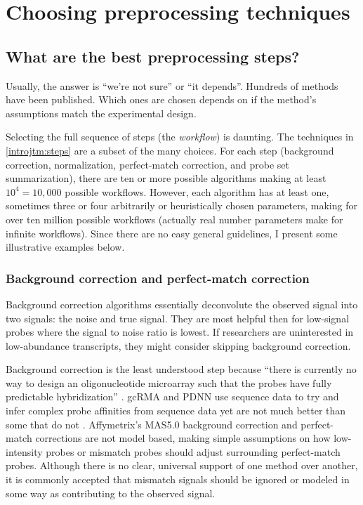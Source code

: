 \section{Choosing preprocessing techniques}

\subsection{What are the best preprocessing steps?}\label{introjtm:whatsbest}

Usually, the answer is ``we're not sure'' or ``it depends''. 
Hundreds of methods have been published.
Which ones are chosen depends on if the method's assumptions match
the experimental design.

Selecting the full sequence of steps (the \textit{workflow}) is daunting.
The techniques in \ref{introjtm:steps} are a subset of the many choices.
For each step (background correction, normalization,
perfect-match correction, and probe set summarization), there are
ten or more possible algorithms making at least $10^4=10,000$ possible
workflows. However, each algorithm has at least one, sometimes
three or four arbitrarily or heuristically chosen parameters, making
for over ten million possible workflows (actually real number parameters make 
for infinite workflows).
Since there are no easy general guidelines, I present some
illustrative examples below. 

\subsubsection{Background correction and perfect-match correction}

Background correction algorithms essentially deconvolute the observed
signal into two signals: the noise and true signal.
They are most helpful then for low-signal probes where
the signal to noise ratio is lowest. If researchers are uninterested
in low-abundance transcripts, they might consider skipping
background correction.

Background correction is the least understood step because
``there is currently no way to design 
an oligonucleotide microarray such that the probes have 
fully predictable hybridization'' \cite{Pozhitkov:2007go}.
gcRMA and PDNN use sequence data to try and infer complex
probe affinities from sequence data yet are not much better than
some that do not \cite{Irizarry:2003ge,Zhang:2003to,Wu:2004wh}.
Affymetrix's MAS5.0 background correction and perfect-match corrections
are not model based, making simple assumptions on how low-intensity probes
or mismatch probes should adjust surrounding perfect-match probes.
Although there is no clear, universal support of one method over another,  
it is commonly accepted that 
mismatch signals should be ignored or modeled in some way as 
contributing to the observed signal.

